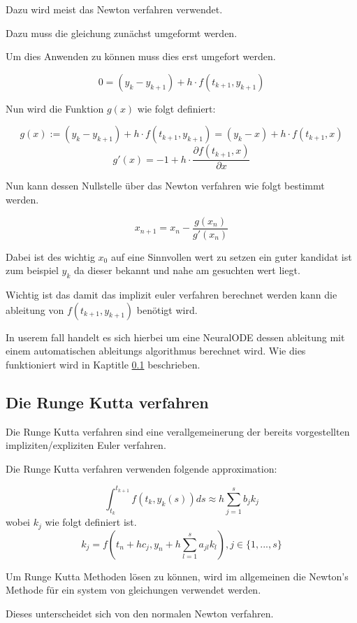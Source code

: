 Dazu wird meist das Newton verfahren verwendet.

Dazu muss die gleichung zunächst umgeformt werden.

Um dies Anwenden zu können muss dies erst umgefort werden.

$$
0 = (y_k - y_{k + 1})  + h \cdot f(t_{k + 1}, y_{k + 1})
$$

Nun wird die Funktion $g(x)$ wie folgt definiert:

$$
g(x) := (y_k - y_{k + 1})  + h \cdot f(t_{k + 1}, y_{k + 1}) = (y_k - x)  + h \cdot f(t_{k + 1}, x)
$$
$$
g'(x) = -1 + h \cdot \frac{\partial f(t_{k+1}, x)}{\partial x}
$$

Nun kann dessen Nullstelle über das Newton verfahren wie folgt bestimmt werden.

$$
x_{n+1} = x_{n} - \frac{g(x_n)}{g'(x_n)}
$$

Dabei ist des wichtig $x_{0}$ auf eine Sinnvollen wert zu setzen ein guter kandidat ist zum beispiel
$y_{k}$ da dieser bekannt und nahe am gesuchten wert liegt.

Wichtig ist das damit das implizit euler verfahren berechnet werden kann die ableitung von $f(t_{k + 1}, y_{k + 1})$ benötigt wird.

In userem fall handelt es sich hierbei um eine NeuralODE dessen ableitung mit einem automatischen ableitungs algorithmus berechnet wird. Wie dies funktioniert wird in Kaptitle \ref{} beschrieben.



\subsection{Die Runge Kutta verfahren}

Die Runge Kutta verfahren sind eine verallgemeinerung der
bereits vorgestellten impliziten/expliziten Euler verfahren.

Die Runge Kutta verfahren verwenden folgende approximation:

$$
\int_{t_k}^{t_{k+1}} f(t_k, y_k(s)) ds \approx h \sum_{j=1}^{s} b_j k_j
$$
wobei $k_j$ wie folgt definiert ist.
$$
k_j = f(t_n + h c_j, y_n + h \sum_{l=1}^{s}a_{jl}k_{l}) , j \in \{1, ..., s\}
$$


Um Runge Kutta Methoden lösen zu können, wird im allgemeinen die Newton's Methode für ein 
system von gleichungen verwendet werden.

Dieses unterscheidet sich von den normalen Newton verfahren.

